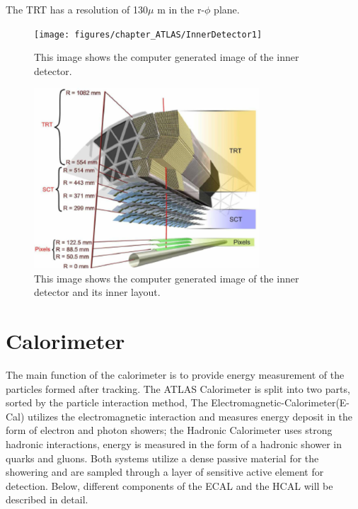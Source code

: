 The TRT has a resolution of 130$\mu$ m in the r-$\phi$ plane.

\begin{figure}[!htb]
    \begin{center}
        \texttt{[image: figures/chapter\_ATLAS/InnerDetector1]}
        \caption{
		    This image shows the computer generated image of the inner detector. \cite{Pequenao:1095926} 
        }
        \label{fig:InnerDetector}
    \end{center}
\end{figure}

\begin{figure}[!htb]
    \begin{center}
        \includegraphics[width=0.75\textwidth]{figures/chapter_ATLAS/InnerDetector2}
        \caption{
		    This image shows the computer generated image of the inner detector and its inner layout. \cite{Pequenao:1095926}
        }
        \label{fig:InnerDetector2}
    \end{center}
\end{figure}

\section{Calorimeter}
The main function of the calorimeter is to provide energy measurement of the particles formed after tracking. The ATLAS Calorimeter is split into two parts, sorted by the particle interaction method, The Electromagnetic-Calorimeter(E-Cal) utilizes the electromagnetic interaction and measures energy deposit in the form of electron and photon showers; the Hadronic Calorimeter uses strong hadronic interactions, energy is measured in the form of a hadronic shower in quarks and gluons. Both
systems utilize a dense passive material for the showering and are sampled through a layer of sensitive active element for detection. Below, different components of the ECAL and the HCAL will be described in detail. 

